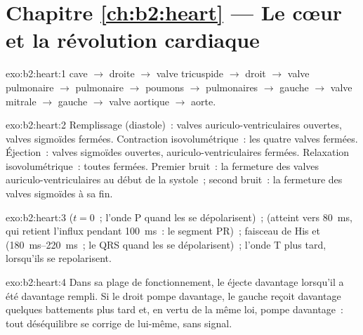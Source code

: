 \section*{Chapitre \ref{ch:b2:heart} --- Le cœur et la révolution cardiaque}

\begin{solution}{exo:b2:heart:1}
 cave $\to$  droite $\to$ valve tricuspide $\to$ 
droit $\to$ valve pulmonaire $\to$  pulmonaire $\to$ poumons
$\to$  pulmonaires $\to$  gauche $\to$ valve mitrale
$\to$  gauche $\to$ valve aortique $\to$ aorte.
\end{solution}

\begin{solution}{exo:b2:heart:2}
Remplissage (diastole)~: valves auriculo-ventriculaires ouvertes, valves
sigmoïdes fermées. Contraction isovolumétrique~: les quatre valves
fermées. Éjection~: valves sigmoïdes ouvertes, auriculo-ventriculaires
fermées. Relaxation isovolumétrique~: toutes fermées. Premier bruit~: la
fermeture des valves auriculo-ventriculaires au début de la systole~;
second bruit~: la fermeture des valves sigmoïdes à sa fin.
\end{solution}

\begin{solution}{exo:b2:heart:3}
 ($t = 0$~; l'onde P quand les  se
dépolarisent)~;  (atteint vers \qty{80}{ms}, qui
retient l'influx pendant \qty{100}{ms}~: le segment PR)~; faisceau de His
et  (\qtyrange{180}{220}{ms}~; le QRS quand les
 se dépolarisent)~; l'onde T plus tard, lorsqu'ils se
repolarisent.
\end{solution}

\begin{solution}{exo:b2:heart:4}
Dans sa plage de fonctionnement, le  éjecte davantage lorsqu'il
a été davantage rempli. Si le  droit pompe davantage, le gauche
reçoit davantage quelques battements plus tard et, en vertu de la même
loi, pompe davantage~: tout déséquilibre se corrige de lui-même, sans
signal.
\end{solution}

